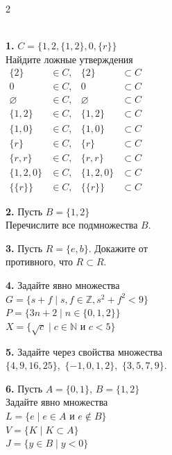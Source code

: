 \begin{multicols}{2}
\begin{exercise}
\ \\
\noindent \textbf{1.}
$C = \{ 1, 2, \{1,2\}, 0, \{r\} \}$\\
Найдите ложные утверждения\\
{\setlength{\jot}{0pt}
$\begin{aligned}
\{2\} &\in C, &\{2\} &\subset C\\
0     &\in C, &0     &\subset C\\
\varnothing &\in C, &\varnothing &\subset C\\
\{1,2\} &\in C, &\{1,2\} &\subset C\\
\{1,0\} &\in C, &\{1,0\} &\subset C\\
\{r\} &\in C, &\{r\} &\subset C\\
\{r,r\} &\in C, &\{r,r\} &\subset C\\
\{1,2,0\} &\in C, &\{1,2,0\} &\subset C\\
\{\{r\}\} &\in C, &\{\{r\}\} &\subset C
\end{aligned}$}

\bigskip\noindent \textbf{2.}
Пусть $B=\{1,2\}$\\
Перечислите все подмножества $B$.

\medskip\noindent \textbf{3.}
Пусть $R=\{e,b\}$.
Докажите от\\
противного, что $R \subset R$.

\medskip\noindent \textbf{4.}
Задайте явно множества\\
$G=\{s+f\mid s,f\in \mathbb{Z},s^2+f^2<9\}$\\
$P=\{3n+2\mid n\in \{0,1,2\}\}$\\
$X=\{\sqrt{c}\mid c\in \mathbb{N}\text{ и } c<5\}$

\medskip\noindent \textbf{5.}
Задайте через свойства множества\\
$\{4,9,16,25\}$,\,
$\{-1,0,1,2\}$,\,
$\{3,5,7,9\}$.

\medskip\noindent \textbf{6.}
Пусть $A=\{0,1\}$, $B=\{1,2\}$\\
Задайте явно множества\\
$L=\{e\mid e \in A \text{ и } e\notin B\}$\\
$V=\{K\mid K\subset A\}$\\
$J=\{y \in B\mid y<0\}$
\end{exercise}
\end{multicols}